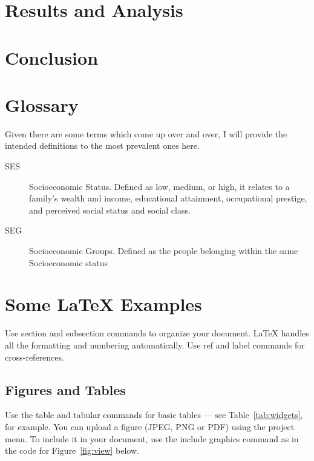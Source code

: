 \documentclass[fleqn,10pt]{olplainarticle}
\begin{document}
\section*{Results and Analysis}
\section*{Conclusion}
\section*{Glossary}
Given there are some terms which come up over and over, I will provide the intended definitions to the most prevalent ones here.

\begin{description}
\item[SES] Socioeconomic Status. Defined as low, medium, or high, it relates to a family's wealth and income, educational attainment, occupational prestige, and perceived social status and social class.\citep{sesdef}
\item[SEG] Socioeconomic Groups. Defined as the people belonging within the same Socioeconomic status
\end{description}

\section*{Some \LaTeX{} Examples}
\label{sec:examples}

Use section and subsection commands to organize your document. \LaTeX{} handles all the formatting and numbering automatically. Use ref and label commands for cross-references.

\subsection*{Figures and Tables}

Use the table and tabular commands for basic tables --- see Table~\ref{tab:widgets}, for example. You can upload a figure (JPEG, PNG or PDF) using the project menu. To include it in your document, use the include graphics command as in the code for Figure~\ref{fig:view} below.
\end{document}
